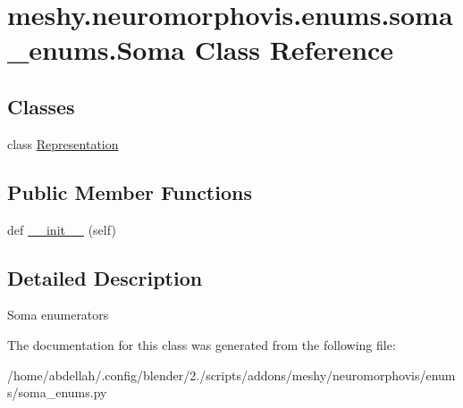 \hypertarget{classmeshy_1_1neuromorphovis_1_1enums_1_1soma__enums_1_1Soma}{}\section{meshy.\+neuromorphovis.\+enums.\+soma\+\_\+enums.\+Soma Class Reference}
\label{classmeshy_1_1neuromorphovis_1_1enums_1_1soma__enums_1_1Soma}


 


\subsection*{Classes}
\begin{DoxyCompactItemize}
\item 
class \hyperlink{classmeshy_1_1neuromorphovis_1_1enums_1_1soma__enums_1_1Soma_1_1Representation}{Representation}
\end{DoxyCompactItemize}
\subsection*{Public Member Functions}
\begin{DoxyCompactItemize}
\item 
def \hyperlink{classmeshy_1_1neuromorphovis_1_1enums_1_1soma__enums_1_1Soma_a551699333a1fe532f3bc7ff401d6cffc}{\+\_\+\+\_\+init\+\_\+\+\_\+} (self)\hypertarget{classmeshy_1_1neuromorphovis_1_1enums_1_1soma__enums_1_1Soma_a551699333a1fe532f3bc7ff401d6cffc}{}\label{classmeshy_1_1neuromorphovis_1_1enums_1_1soma__enums_1_1Soma_a551699333a1fe532f3bc7ff401d6cffc}

\end{DoxyCompactItemize}


\subsection{Detailed Description}


\begin{DoxyVerb}Soma enumerators
\end{DoxyVerb}
 

The documentation for this class was generated from the following file\+:\begin{DoxyCompactItemize}
\item 
/home/abdellah/.\+config/blender/2./scripts/addons/meshy/neuromorphovis/enums/soma\+\_\+enums.\+py\end{DoxyCompactItemize}
